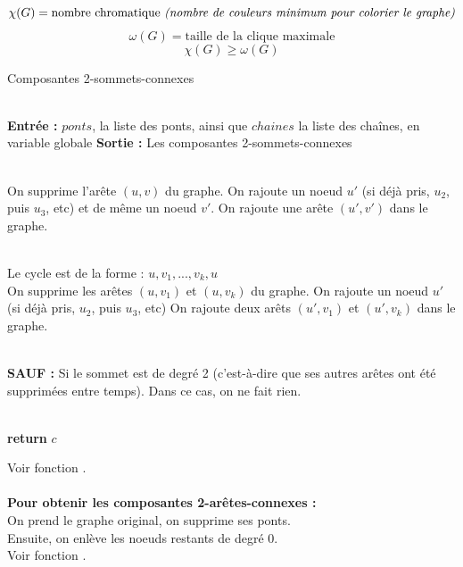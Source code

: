\documentclass{article}      %
\begin{document}
$$\chi(G) = \text{nombre chromatique \textit{(nombre de couleurs minimum pour colorier le graphe)}}$$
$$\omega(G) = \text{taille de la clique maximale}$$
$$\chi(G) \geqslant \omega(G)$$
\begin{algorithm}[H] \caption{Composantes 2-sommets-connexes}
\begin{algorithmic}

\\ \State \textbf{Entrée :} $ponts$, la liste des ponts, ainsi que $chaines$ la liste des chaînes, en variable globale
\State \textbf{Sortie :} Les composantes 2-sommets-connexes

\\ 
    \State On supprime l'arête $(u, v)$ du graphe.
    \State On rajoute un noeud $u'$ (si déjà pris, $u_2$, puis $u_3$, etc) et de même un noeud $v'$.
    \State On rajoute une arête $(u', v')$ dans le graphe.
\EndFor

\\ 
    \State Le cycle est de la forme : $u, v_1, ..., v_k, u$
    \\\State On supprime les arêtes $(u, v_1)$ et $(u, v_k)$ du graphe.        
    \State On rajoute un noeud $u'$ (si déjà pris, $u_2$, puis $u_3$, etc)
    \State On rajoute deux arêts $(u', v_1)$ et $(u', v_k)$ dans le graphe.
    
    \\\State \textbf{SAUF :} 
    \State Si le sommet est de degré 2 (c'est-à-dire que ses autres arêtes ont été supprimées entre temps).
    \State Dans ce cas, on ne fait rien.
\EndFor

\\ \State \textbf{return} $c$
\end{algorithmic}
\end{algorithm}


Voir fonction .
%
%
\\\\\textbf{Pour obtenir les composantes 2-arêtes-connexes :}
\\On prend le graphe original, on supprime ses ponts.
\\Ensuite, on enlève les noeuds restants de degré 0.
\\Voir fonction .
%
\end{document}
